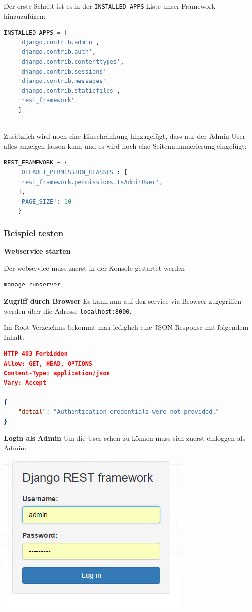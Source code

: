 Der erste Schritt ist es in der \verb|INSTALLED_APPS| Liste unser Framework hinzuzufügen:

\begin{lstlisting}[language=Python]
INSTALLED_APPS = [
	'django.contrib.admin',
	'django.contrib.auth',
	'django.contrib.contenttypes',
	'django.contrib.sessions',
	'django.contrib.messages',
	'django.contrib.staticfiles',
	'rest_framework'
	]
	
\end{lstlisting}

Zusätzlich wird noch eine Einschränkung hinzugefügt, dass nur der Admin User alles anzeigen lassen kann und es wird noch eine Seitennummerierung eingefügt:

\begin{lstlisting}[language=Python]
REST_FRAMEWORK = {
	'DEFAULT_PERMISSION_CLASSES': [
	'rest_framework.permissions.IsAdminUser',
	],
	'PAGE_SIZE': 10
	}
\end{lstlisting}

\subsubsection{Beispiel testen}
\textbf{Webservice starten}

Der webservice muss zuerst in der Konsole gestartet werden
\begin{lstlisting}[language=Bash]
manage runserver
\end{lstlisting}

\textbf{Zugriff durch Browser}
Es kann nun auf den service via Browser zugegriffen werden über die Adresse \verb|localhost:8000|.

Im Root Verzeichnis bekommt man lediglich eine JSON Response mit folgendem Inhalt:

\begin{lstlisting}[language=JSON]
HTTP 403 Forbidden
Allow: GET, HEAD, OPTIONS
Content-Type: application/json
Vary: Accept

{
	"detail": "Authentication credentials were not provided."
}
\end{lstlisting}

\textbf{Login als Admin}
Um die User sehen zu können muss sich zuerst einloggen als Admin:

\begin{minipage}{\linewidth}
	\centering
	\includegraphics[width=0.5\linewidth]{images/login}
\end{minipage}

